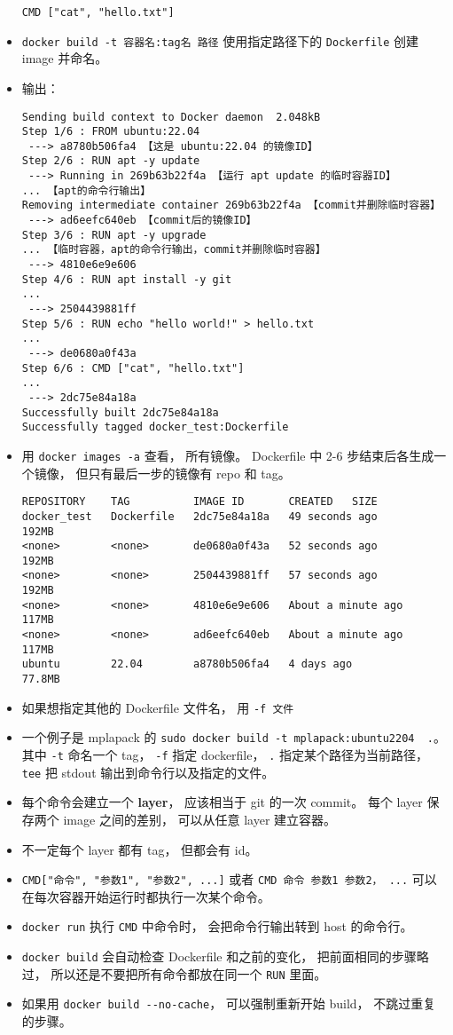 \begin{itemize}
\begin{lstlisting}[language=none]
CMD ["cat", "hello.txt"]
\end{lstlisting}
\item \verb|docker build -t 容器名:tag名 路径| 使用指定路径下的 \verb|Dockerfile| 创建 image 并命名。
\item 输出：
\begin{lstlisting}[language=none]
Sending build context to Docker daemon  2.048kB
Step 1/6 : FROM ubuntu:22.04
 ---> a8780b506fa4 【这是 ubuntu:22.04 的镜像ID】
Step 2/6 : RUN apt -y update
 ---> Running in 269b63b22f4a 【运行 apt update 的临时容器ID】
... 【apt的命令行输出】
Removing intermediate container 269b63b22f4a 【commit并删除临时容器】
 ---> ad6eefc640eb 【commit后的镜像ID】
Step 3/6 : RUN apt -y upgrade
... 【临时容器，apt的命令行输出，commit并删除临时容器】
 ---> 4810e6e9e606
Step 4/6 : RUN apt install -y git
...
 ---> 2504439881ff
Step 5/6 : RUN echo "hello world!" > hello.txt
...
 ---> de0680a0f43a
Step 6/6 : CMD ["cat", "hello.txt"]
...
 ---> 2dc75e84a18a
Successfully built 2dc75e84a18a
Successfully tagged docker_test:Dockerfile
\end{lstlisting}
\item 用 \verb|docker images -a| 查看， 所有镜像。 Dockerfile 中 2-6 步结束后各生成一个镜像， 但只有最后一步的镜像有 repo 和 tag。
\begin{lstlisting}[language=none]
REPOSITORY    TAG          IMAGE ID       CREATED   SIZE
docker_test   Dockerfile   2dc75e84a18a   49 seconds ago       192MB
<none>        <none>       de0680a0f43a   52 seconds ago       192MB
<none>        <none>       2504439881ff   57 seconds ago       192MB
<none>        <none>       4810e6e9e606   About a minute ago   117MB
<none>        <none>       ad6eefc640eb   About a minute ago   117MB
ubuntu        22.04        a8780b506fa4   4 days ago           77.8MB
\end{lstlisting}
\item 如果想指定其他的 Dockerfile 文件名， 用 \verb|-f 文件|
\item 一个例子是 mplapack 的 \verb|sudo docker build -t mplapack:ubuntu2204  .|。 其中 \verb|-t| 命名一个 tag， \verb|-f| 指定 dockerfile， \verb|.| 指定某个路径为当前路径， \verb|tee| 把 stdout 输出到命令行以及指定的文件。
\item 每个命令会建立一个 \textbf{layer}， 应该相当于 git 的一次 commit。 每个 layer 保存两个 image 之间的差别， 可以从任意 layer 建立容器。
\item 不一定每个 layer 都有 tag， 但都会有 id。
\item \verb|CMD["命令", "参数1", "参数2", ...]| 或者 \verb|CMD 命令 参数1 参数2， ...| 可以在每次容器开始运行时都执行一次某个命令。
\item \verb|docker run| 执行 \verb|CMD| 中命令时， 会把命令行输出转到 host 的命令行。
\item \verb|docker build| 会自动检查 Dockerfile 和之前的变化， 把前面相同的步骤略过， 所以还是不要把所有命令都放在同一个 \verb|RUN| 里面。
\item 如果用 \verb|docker build --no-cache|， 可以强制重新开始 build， 不跳过重复的步骤。
\end{itemize}

